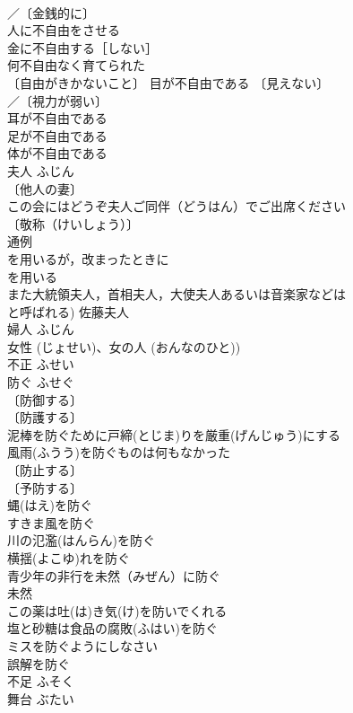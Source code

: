\documentclass[8pt]{extreport}
\begin{document}
\begin{CJK}{UTF8}{min}
\\	／〔金銭的に〕
\\	人に不自由をさせる 
\\	金に不自由する［しない］ 
\\	何不自由なく育てられた 
\\	〔自由がきかないこと〕 目が不自由である 〔見えない〕
\\	／〔視力が弱い〕
\\	耳が不自由である 
\\	足が不自由である 
\\	体が不自由である 
\\	夫人	ふじん	
\\	〔他人の妻〕
\\	この会にはどうぞ夫人ご同伴（どうはん）でご出席ください 
\\	〔敬称（けいしょう）〕
\\	通例
\\	を用いるが，改まったときに
\\	を用いる
\\	また大統領夫人，首相夫人，大使夫人あるいは音楽家などは
\\	と呼ばれる) 佐藤夫人 
\\	婦人	ふじん	
\\	女性 (じょせい)、女の人 (おんなのひと))
\\	不正	ふせい	
\\	防ぐ	ふせぐ	
\\	〔防御する〕
\\	〔防護する〕
\\	泥棒を防ぐために戸締(とじま)りを厳重(げんじゅう)にする 
\\	風雨(ふうう)を防ぐものは何もなかった 
\\	〔防止する〕
\\	〔予防する〕
\\	蝿(はえ)を防ぐ 
\\	すきま風を防ぐ 
\\	川の氾濫(はんらん)を防ぐ 
\\	横揺(よこゆ)れを防ぐ 
\\	青少年の非行を未然（みぜん）に防ぐ 
\\	未然 
\\	この薬は吐(は)き気(け)を防いでくれる 
\\	塩と砂糖は食品の腐敗(ふはい)を防ぐ 
\\	ミスを防ぐようにしなさい 
\\	誤解を防ぐ 
\\	不足	ふそく	
\\	舞台	ぶたい	

\end{CJK}
\end{document}
